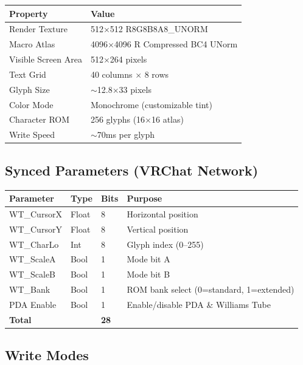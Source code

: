 \documentclass[10pt]{article}
\begin{document}
\begin{center}
{\small
\begin{tabular}{ll}
  \toprule
  \textbf{Property} & \textbf{Value} \\
  \midrule
  Render Texture & 512$\times$512 R8G8B8A8\_UNORM \\
  Macro Atlas & 4096$\times$4096 R Compressed BC4 UNorm \\
  Visible Screen Area & 512$\times$264 pixels \\
  Text Grid & 40 columns $\times$ 8 rows \\
  Glyph Size & $\sim$12.8$\times$33 pixels \\
  Color Mode & Monochrome (customizable tint) \\
  Character ROM & 256 glyphs (16$\times$16 atlas) \\
  Write Speed & $\sim$70ms per glyph \\
  \bottomrule
\end{tabular}
}
\end{center}

\subsection{Synced Parameters (VRChat Network)}

\begin{center}
{\small
\begin{tabular}{llll}
  \toprule
  \textbf{Parameter} & \textbf{Type} & \textbf{Bits} & \textbf{Purpose} \\
  \midrule
  WT\_CursorX & Float & 8 & Horizontal position \\
  WT\_CursorY & Float & 8 & Vertical position \\
  WT\_CharLo & Int & 8 & Glyph index (0--255) \\
  WT\_ScaleA & Bool & 1 & Mode bit A \\
  WT\_ScaleB & Bool & 1 & Mode bit B \\
  WT\_Bank & Bool & 1 & ROM bank select (0=standard, 1=extended) \\
  PDA Enable & Bool & 1 & Enable/disable PDA \& Williams Tube \\
  \midrule
  \textbf{Total} & & \textbf{28} & \\
  \bottomrule
\end{tabular}
}
\end{center}

\subsection{Write Modes}
\label{sec:writemodes}
\end{document}
